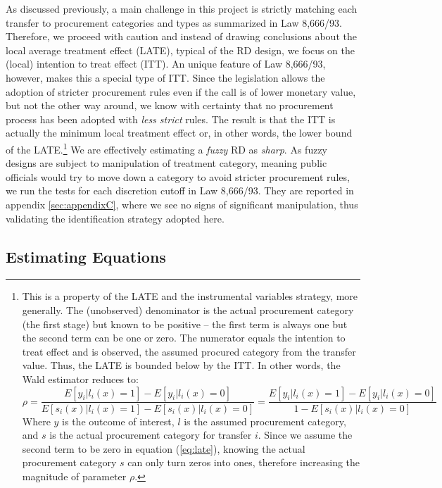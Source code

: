 \documentclass[11pt]{article}
\begin{document}
As discussed previously, a main challenge in this project is strictly matching each transfer to procurement categories and types as summarized in Law 8,666/93. Therefore, we proceed with caution and instead of drawing conclusions about the local average treatment effect (LATE), typical of the RD design, we focus on the (local) intention to treat effect (ITT). An unique feature of Law 8,666/93, however, makes this a special type of ITT. Since the legislation allows the adoption of stricter procurement rules even if the call is of lower monetary value, but not the other way around, we know with certainty that no procurement process has been adopted with \emph{less strict} rules. The result is that the ITT is actually the minimum local treatment effect or, in other words, the lower bound of the LATE.\footnote{This is a property of the LATE and the instrumental variables strategy, more generally. The (unobserved) denominator is the actual procurement category (the first stage) but known to be positive -- the first term is always one but the second term can be one or zero. The numerator equals the intention to treat effect and is observed, the assumed procured category from the transfer value. Thus, the LATE is bounded below by the ITT. In other words, the Wald estimator reduces to:
\begin{equation} \label{eq:late}
  \rho = \frac{E[y_{i}|l_{i}(x)=1]-E[y_{i}|l_{i}(x)=0]}{E[s_{i}(x)|l_{i}(x)=1]-E[s_{i}(x)|l_{i}(x)=0]} = \frac{E[y_{i}|l_{i}(x)=1]-E[y_{i}|l_{i}(x)=0]}{1-E[s_{i}(x)|l_{i}(x)=0]}
\end{equation}
Where $y$ is the outcome of interest, $l$ is the assumed procurement category, and $s$ is the actual procurement category for transfer $i$. Since we assume the second term to be zero in equation (\ref{eq:late}), knowing the actual procurement category $s$ can only turn zeros into ones, therefore increasing the magnitude of parameter $\rho$.} We are effectively estimating a \emph{fuzzy} RD as \emph{sharp}. As fuzzy designs are subject to manipulation of treatment category, meaning public officials would try to move down a category to avoid stricter procurement rules, we run the \citet{McCraryManipulationrunningvariable2008} tests for each discretion cutoff in Law 8,666/93. They are reported in appendix \ref{sec:appendixC}, where we see no signs of significant manipulation, thus validating the identification strategy adopted here.

\subsection{Estimating Equations} \label{subsec:equations}
\end{document}
